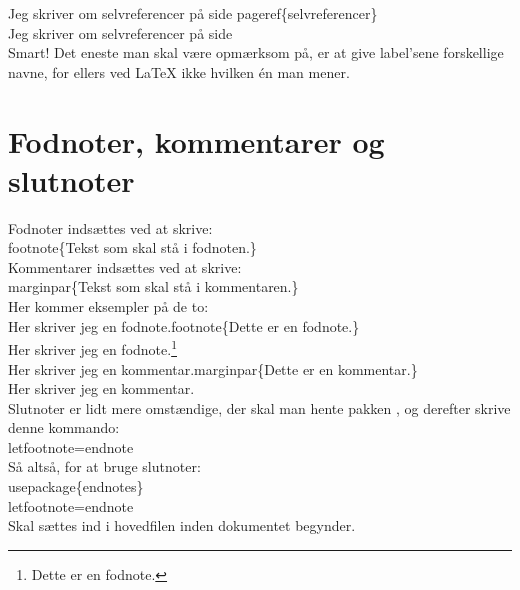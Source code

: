 \indent Jeg skriver om selvreferencer på side \bs pageref\{selvreferencer\}\\
\indent Jeg skriver om selvreferencer på side \pageref{selvreferencer}\\

\noindent
Smart! Det eneste man skal være opmærksom på, er at give \bs label'sene forskellige navne, for ellers ved LaTeX ikke hvilken én man mener.

\section{Fodnoter, kommentarer og slutnoter}
Fodnoter indsættes ved at skrive:\\

\bs footnote\{Tekst som skal stå i fodnoten.\}\\

\noindent
Kommentarer indsættes ved at skrive:\\

\bs marginpar\{Tekst som skal stå i kommentaren.\}\\

\noindent
Her kommer eksempler på de to:\\

\indent Her skriver jeg en fodnote.\bs footnote\{Dette er en fodnote.\}\\
\indent Her skriver jeg en fodnote.\footnote{Dette er en fodnote.}\\
\indent Her skriver jeg en kommentar.\bs marginpar\{Dette er en kommentar.\}\\
\indent Her skriver jeg en kommentar.\\

\noindent
Slutnoter er lidt mere omstændige, der skal man hente pakken , og derefter skrive denne kommando:\\

\bs let\bs footnote=\bs endnote\\

\noindent
Så altså, for at bruge slutnoter:\\

\indent \bs usepackage\{endnotes\}\\
\indent \bs let\bs footnote=\bs endnote\\

\noindent
Skal sættes ind i hovedfilen inden dokumentet begynder.